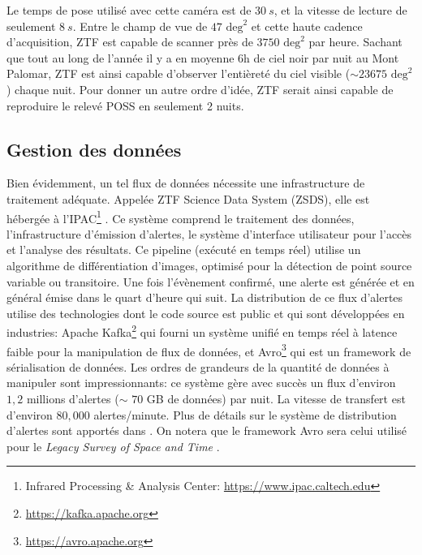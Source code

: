 \documentclass[../main/main.tex]{subfiles}
\begin{document}
Le temps de pose utilisé avec cette caméra est de $\SI{30}{s}$, et la vitesse
de lecture de seulement $\SI{8}{s}$. Entre le champ de vue de
$47\text{ deg}^{2}$ et cette haute cadence d'acquisition, ZTF est capable
de scanner près de $3750\text{ deg}^{2}$ par heure. Sachant que tout au long
de l'année il y a en moyenne 6h de ciel noir par nuit au Mont Palomar, ZTF est ainsi
capable d'observer l'entièreté du ciel visible ($\sim23675\text{ deg}^{2}$) chaque nuit. Pour donner un autre
ordre d'idée, ZTF serait ainsi capable de reproduire le relevé POSS
\citep[][$3$ bandes $B_J$, $R$ et $I$ avec une profondeur
respective de $22.5$~mag, $20.8$~mag et $19.5$~mag]{MinkowskiPOSS} en seulement 2 nuits.


\subsection{Gestion des données}

Bien évidemment, un tel flux de données nécessite une infrastructure de
traitement adéquate. Appelée ZTF Science Data System (ZSDS), elle 
est hébergée à l'IPAC\footnote{Infrared Processing \& Analysis Center: \href{https://
www.ipac.caltech.edu}{https://www.ipac.caltech.edu}} \citep{MasciZTF2019}. Ce système
comprend le traitement des données, l'infrastructure
d'émission d'alertes, le système d'interface utilisateur pour l'accès
et l'analyse des résultats. Ce pipeline (exécuté en temps réel) utilise
un algorithme de différentiation d'images, optimisé pour la détection de
point source variable ou transitoire. Une fois l'évènement confirmé, une alerte est générée et
en général émise dans le quart d'heure qui suit. La distribution de
ce flux d'alertes utilise des technologies dont le code source est
public et qui sont développées
en industries: Apache Kafka\footnote{\url{https://kafka.apache.org}} qui
fourni un système unifié en temps réel à latence faible pour la
manipulation de flux de données, et
Avro\footnote{\url{https://avro.apache.org}} qui est un framework de
sérialisation de données. Les ordres de grandeurs de la quantité de
données à manipuler sont impressionnants: ce système gère avec succès un
flux d'environ $1,2$ millions d'alertes ($\sim$ $70$ GB de données) par
nuit. La vitesse de transfert est d'environ $80,000$ alertes/minute. Plus
de détails sur le système de distribution d'alertes sont apportés dans
\citet{PattersonZTF2019}. On notera que le framework Avro sera celui utilisé
pour le \textit{Legacy Survey of Space and Time} \citep[LSST;][]{LSSTbook2}.
\end{document}
